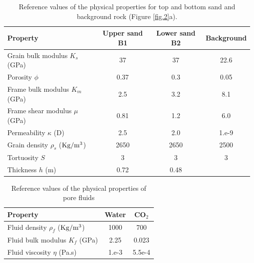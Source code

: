 \documentclass[draft]{agujournal2019}
\begin{document}
\begin{table}[!ht]
  \caption{Reference values of the physical properties for top and bottom sand and background rock (Figure \ref{fig.2}a). }
\begin{center}
  \begin{tabular}{ | l  c  c c | }
    \hline
    Property & Upper sand B1 & Lower
     sand B2 & Background  \\ \hline
    Grain bulk modulus $K_s$ (\rm{GPa}) & 37 & 37 & 22.6 \\ 
    Porosity $\phi$ & 0.37 & 0.3 & 0.05  \\ 
    Frame bulk modulus $K_m$ (GPa) & 2.5  & 3.2 & 8.1\\ 
    Frame shear modulus $\mu$ (GPa) & 0.81  & 1.2 & 6.0 \\
    Permeability $\kappa$ (D) & 2.5 & 2.0 & 1.e-9 \\
    Grain density $\rho_s$ ($\rm{Kg/m^3}$) &2650 & 2650 & 2500\\ 
    Tortuosity $S$ & 3 & 3 & 3\\
    Thickness $h$ (m) & 0.72 & 0.48 & \\ 
                                       
    \hline
  \end{tabular}
  \label{table.1}
\end{center}
\end{table}

\begin{table}[!ht]
  \caption{Reference values of the physical properties of pore fluids}
\begin{center}
  \begin{tabular}{ | l | c | c |  }
    \hline
    Property & Water & CO$_2$\\ \hline
    Fluid density $\rho_f$ ($\rm{Kg/m^3}$) & 1000 & 700\\
    Fluid bulk modulus $K_f$ (\rm{GPa}) & 2.25 & 0.023\\
    Fluid viscosity $\eta$ (\rm{Pa.s})& 1.e-3 & 5.5e-4\\
    \hline
  \end{tabular}
  \label{table.2}
\end{center}
\end{table}
\end{document}
